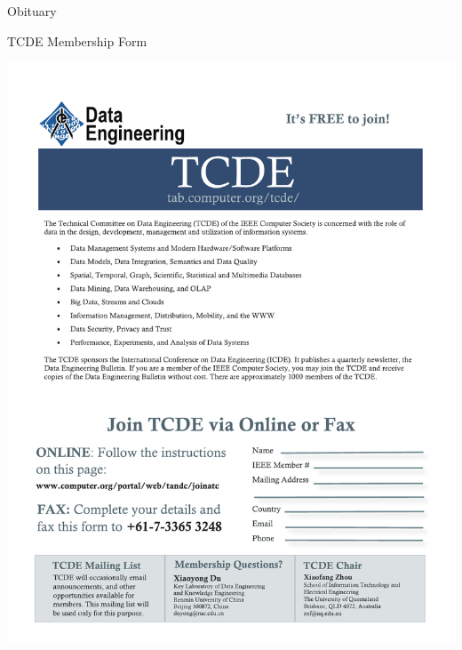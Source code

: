 \documentclass[11pt]{article}
\begin{document}
\begin{bulletin}
\begin{newssection}{Obituary}
\newpage
\end{newssection}


\begin{callsection}

%
%
\begin{call}{TCDE Membership Form}
\centerline{\includegraphics[width=\textwidth, bb= 0 0 590 760] {../2020-09/calls/tcde.pdf}}
\end{call}

\end{callsection}

\end{bulletin}
\end{document}
